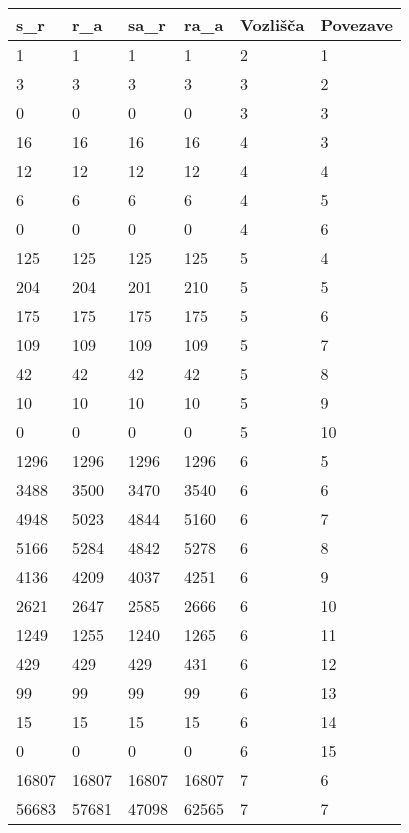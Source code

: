 \documentclass[fin1, tisk]{fmfdelo}
\begin{document}
\begin{table}[!ht]
    \centering
    \begin{tabular}{|l|l|l|l|l|l|}
    \hline
        s\_r & r\_a & sa\_r & ra\_a & Vozlišča & Povezave \\ \hline
        1 & 1 & 1 & 1 & 2 & 1 \\ \hline
        3 & 3 & 3 & 3 & 3 & 2 \\ \hline
        0 & 0 & 0 & 0 & 3 & 3 \\ \hline
        16 & 16 & 16 & 16 & 4 & 3 \\ \hline
        12 & 12 & 12 & 12 & 4 & 4 \\ \hline
        6 & 6 & 6 & 6 & 4 & 5 \\ \hline
        0 & 0 & 0 & 0 & 4 & 6 \\ \hline
        125 & 125 & 125 & 125 & 5 & 4 \\ \hline
        204 & 204 & 201 & 210 & 5 & 5 \\ \hline
        175 & 175 & 175 & 175 & 5 & 6 \\ \hline
        109 & 109 & 109 & 109 & 5 & 7 \\ \hline
        42 & 42 & 42 & 42 & 5 & 8 \\ \hline
        10 & 10 & 10 & 10 & 5 & 9 \\ \hline
        0 & 0 & 0 & 0 & 5 & 10 \\ \hline
        1296 & 1296 & 1296 & 1296 & 6 & 5 \\ \hline
        3488 & 3500 & 3470 & 3540 & 6 & 6 \\ \hline
        4948 & 5023 & 4844 & 5160 & 6 & 7 \\ \hline
        5166 & 5284 & 4842 & 5278 & 6 & 8 \\ \hline
        4136 & 4209 & 4037 & 4251 & 6 & 9 \\ \hline
        2621 & 2647 & 2585 & 2666 & 6 & 10 \\ \hline
        1249 & 1255 & 1240 & 1265 & 6 & 11 \\ \hline
        429 & 429 & 429 & 431 & 6 & 12 \\ \hline
        99 & 99 & 99 & 99 & 6 & 13 \\ \hline
        15 & 15 & 15 & 15 & 6 & 14 \\ \hline
        0 & 0 & 0 & 0 & 6 & 15 \\ \hline
        16807 & 16807 & 16807 & 16807 & 7 & 6 \\ \hline
        56683 & 57681 & 47098 & 62565 & 7 & 7 \\ \hline

\end{tabular}
\end{table}
\end{document}
